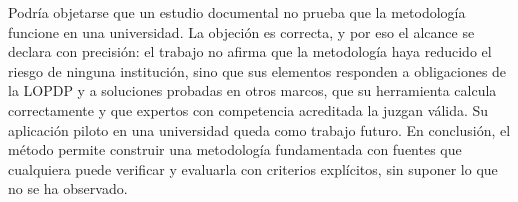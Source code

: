 Podría objetarse que un estudio documental no prueba que la metodología funcione en una universidad. La objeción es correcta, y por eso el alcance se declara con precisión: el trabajo no afirma que la metodología haya reducido el riesgo de ninguna institución, sino que sus elementos responden a obligaciones de la LOPDP y a soluciones probadas en otros marcos, que su herramienta calcula correctamente y que expertos con competencia acreditada la juzgan válida. Su aplicación piloto en una universidad queda como trabajo futuro. En conclusión, el método permite construir una metodología fundamentada con fuentes que cualquiera puede verificar y evaluarla con criterios explícitos, sin suponer lo que no se ha observado.
